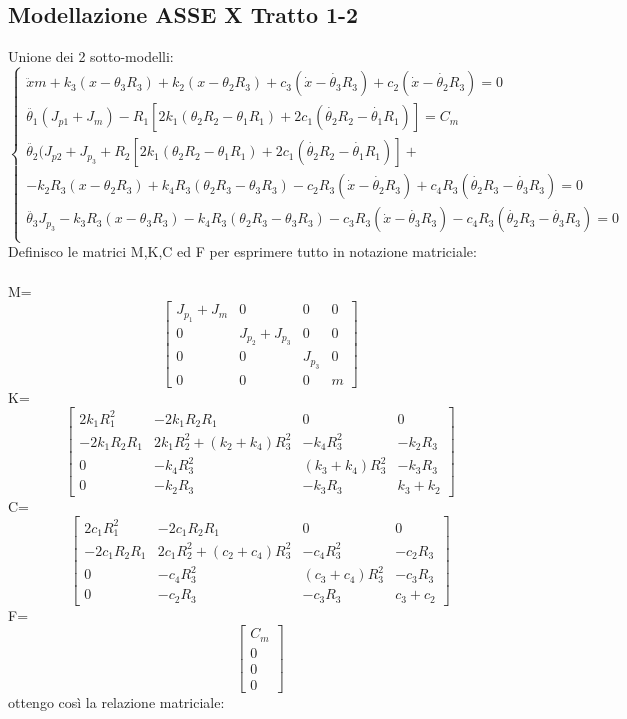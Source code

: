 \documentclass{article}
\begin{document}
\subsection{Modellazione ASSE X  Tratto 1-2} 
Unione dei 2 sotto-modelli:
\begin{equation*}
\begin{cases}
\ddot{x}m + k_{3}(x-\theta_{3}R_{3}) + k_{2}(x- \theta_{2}R_{3})+ c_{3}(\dot{x}-\dot{\theta_3}R_{3}) + c_{2}(\dot{x} - \dot{\theta_{2}}R_{3}) = 0\\
\ddot{\theta_{1}}(J_{p1}+J_{m}) - R_{1}[2k_{1}(\theta_{2}R_{2}-\theta_{1}R_{1})+ 2c_{1}(\dot{\theta_{2}}R_{2}-\dot{\theta_{1}}R_{1})] = C_{m}\\
\ddot{\theta_{2}}(J_{p2} + J_{p_3} + R_{2}[2k_{1}(\theta_{2}R_{2}-\theta_{1}R_{1})+ 2c_{1}(\dot{\theta_{2}}R_{2}-\dot{\theta_{1}}R_{1})]+ \\ - k_{2}R_{3}(x - \theta_{2}R_{3}) + k_{4}R_3(\theta_{2}R_3 - \theta_{3}R_{3}) - c_{2}R_{3}(\dot{x}-\dot{\theta_2}R_{3}) + c_{4}R_{3}(\dot{\theta_2}R_3 - \dot{\theta_{3}}R_{3}) = 0\\
 \ddot{\theta_3}J_{p_3} - k_{3}R_{3}(x - \theta_{3}R_{3}) - k_{4}R_3(\theta_{2}R_3 - \theta_{3}R_{3}) - c_{3}R_{3}(\dot{x}-\dot{\theta_3}R_{3}) - c_{4}R_{3}(\dot{\theta_2}R_3 - \dot{\theta_{3}}R_{3}) = 0\\
\end{cases}
\end{equation*}
Definisco le matrici M,K,C ed F per esprimere tutto in notazione matriciale:
\\
\\
M= 
$$
\begin{bmatrix}
J_{p_1}+J_m  & 0 & 0 & 0\\
0 & J_{p_2}+J_{p_3} & 0 & 0\\
0 & 0 & J_{p_3} & 0\\
0 & 0 & 0 & m
\end{bmatrix}
$$
K= 
$$
\begin{bmatrix}
 2k_1R_1^2 & -2k_1R_{2}R_{1} & 0 & 0\\
-2k_{1}R_{2}R_{1} & 2k_{1}R_{2}^2 + (k_2+k_4)R_{3}^2  & -k_{4}R_{3}^2 & -k_{2}R_{3}\\
0 & -k_{4}R_{3}^2  & (k_{3}+k_{4})R_{3}^2 & -k_{3}R_{3}\\
0 & -k_{2}R_{3} &  -k_{3}R_{3} & k_{3}+k_{2}
\end{bmatrix}
$$
C= 
$$
\begin{bmatrix}
 2c_{1}R_{1}^2 & -2c_{1}R_{2}R_{1} & 0 & 0\\
-2c_{1}R_{2}R_{1} & 2c_{1}R_{2}^2 + (c_{2}+c_{4})R_{3}^2  & -c_{4}R_{3}^2 & -c_{2}R_{3}\\
0 & -c_{4}R_{3}^2  & (c_{3}+c_{4})R_{3}^2 & -c_{3}R_{3}\\
0 & -c_{2}R_{3} &  -c_{3}R_{3} & c_{3}+c_{2}
\end{bmatrix}
$$
F= 
$$
\begin{bmatrix}
C_m \\
0 \\
0\\
0
\end{bmatrix}
$$
ottengo così la relazione matriciale:
\end{document}
